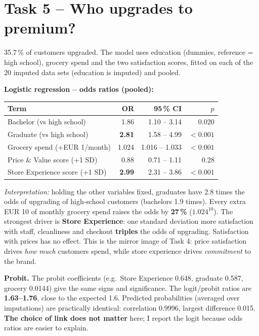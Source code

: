 \documentclass[10pt,a4paper]{article}
\begin{document}
\section{Task 5 -- Who upgrades to premium?}

35.7\,\% of customers upgraded. The model uses education (dummies, reference = high school), grocery spend and the two satisfaction scores, fitted on each of the 20 imputed data sets (education is imputed) and pooled.

\textbf{Logistic regression -- odds ratios (pooled):}

\begin{table}[H]
\centering
\begin{tabular}{lrrr}
\toprule
Term & OR & 95\,\% CI & $p$ \\
\midrule
Bachelor (vs high school)       & 1.86          & 1.10 -- 3.14  & 0.020 \\
Graduate (vs high school)       & \textbf{2.81} & 1.58 -- 4.99  & $< 0.001$ \\
Grocery spend (+EUR 1/month)    & 1.024         & 1.016 -- 1.033 & $< 0.001$ \\
Price \& Value score (+1 SD)    & 0.88          & 0.71 -- 1.11  & 0.28 \\
Store Experience score (+1 SD)  & \textbf{2.99} & 2.31 -- 3.86  & $< 0.001$ \\
\bottomrule
\end{tabular}
\end{table}

\emph{Interpretation:} holding the other variables fixed, graduates have 2.8 times the odds of upgrading of high-school customers (bachelors 1.9 times). Every extra EUR 10 of monthly grocery spend raises the odds by \textbf{27\,\%} ($1.024^{10}$). The strongest driver is \textbf{Store Experience}: one standard deviation more satisfaction with staff, cleanliness and checkout \textbf{triples} the odds of upgrading. Satisfaction with prices has no effect. This is the mirror image of Task 4: price satisfaction drives \emph{how much} customers spend, while store experience drives \emph{commitment} to the brand.

\textbf{Probit.} The probit coefficients (e.g.\ Store Experience 0.648, graduate 0.587, grocery 0.0144) give the same signs and significance. The logit/probit ratios are \textbf{1.63--1.76}, close to the expected 1.6. Predicted probabilities (averaged over imputations) are practically identical: correlation 0.9996, largest difference 0.015. \textbf{The choice of link does not matter} here; I report the logit because odds ratios are easier to explain.
\end{document}
